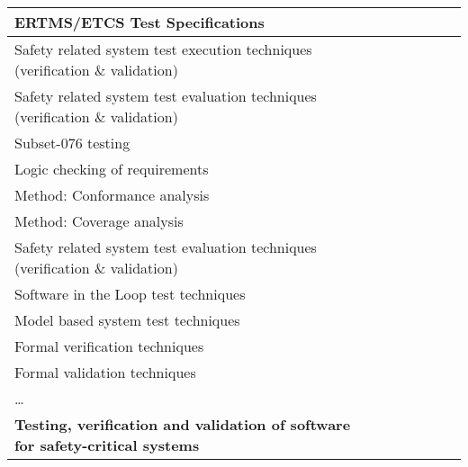 \documentclass[a4paper, 11pt]{article}
\begin{document}
\begin{center}
\begin{longtable}{|r|r|r|r|r|r|r|r|}
    \multicolumn{1}{|l|}{ERTMS/ETCS Test Specifications} & \multicolumn{1}{l|}{} &       &       &       &       &       &  \bigstrut[b]\\
    \hline
    \multicolumn{1}{|l|}{Safety related system test execution techniques (verification \& validation)} & \multicolumn{1}{l|}{} &       &       &       &       &       &  \bigstrut\\
    \hline
    \multicolumn{1}{|l|}{Safety related system test evaluation techniques (verification \& validation)} & \multicolumn{1}{l|}{} &       &       &       &       &       &  \bigstrut\\
    \hline
    \multicolumn{1}{|l|}{Subset-076 testing} & \multicolumn{1}{l|}{} &       &       &       &       &       &  \bigstrut\\
    \hline
    \multicolumn{1}{|l|}{Logic checking of requirements} & \multicolumn{1}{l|}{} &       &       &       &       &       &  \bigstrut\\
    \hline
    \multicolumn{1}{|l|}{Method: Conformance analysis} & \multicolumn{1}{l|}{} &       &       &       &       &       &  \bigstrut\\
    \hline
    \multicolumn{1}{|l|}{Method: Coverage analysis} & \multicolumn{1}{l|}{} &       &       &       &       &       &  \bigstrut\\
    \hline
    \multicolumn{1}{|l|}{Safety related system test evaluation techniques (verification \& validation)} & \multicolumn{1}{l|}{} &       &       &       &       &       &  \bigstrut\\
    \hline
    \multicolumn{1}{|l|}{Software in the Loop test techniques } & \multicolumn{1}{l|}{} &       &       &       &       &       &  \bigstrut\\
    \hline
    \multicolumn{1}{|l|}{Model based system test techniques } & \multicolumn{1}{l|}{} &       &       &       &       &       &  \bigstrut\\
    \hline
    \multicolumn{1}{|l|}{Formal verification techniques} & \multicolumn{1}{l|}{} &       &       &       &       &       &  \bigstrut\\
    \hline
    \multicolumn{1}{|l|}{Formal validation techniques} & \multicolumn{1}{l|}{} &       &       &       &       &       &  \bigstrut\\
    \hline
    \multicolumn{1}{|l|}{…} & \multicolumn{1}{l|}{} &       &       &       &       &       &  \bigstrut[t]\\
    \multicolumn{1}{|l|}{\textbf{Testing, verification and validation of software for safety-critical systems}} & \multicolumn{1}{l|}{\textbf{}} &       &       &       &       &       &  \\

\end{longtable}
\end{center}
\end{document}
